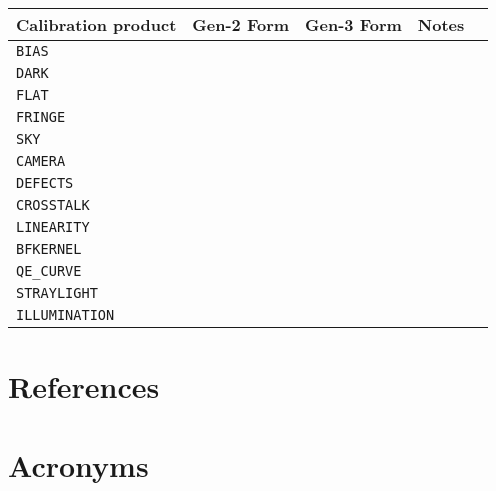 \documentclass[DM,authoryear,toc]{lsstdoc}
\begin{document}
\begin{tabular}{l |c|c|l|l}
  Calibration product & Gen-2 Form & Gen-3 Form & Notes \\
  \hline
  \verb|BIAS| & & & \\
  \verb|DARK| & & & \\
  \verb|FLAT| & & & \\
  \verb|FRINGE| & & & \\
  \verb|SKY| & & & \\
  \verb|CAMERA| & & & \\
  \verb|DEFECTS| & & & \\
  \verb|CROSSTALK| & & & \\
  \verb|LINEARITY| & & & \\
  \verb|BFKERNEL| & & & \\
  \verb|QE_CURVE| & & & \\
  \verb|STRAYLIGHT| & & & \\
  \verb|ILLUMINATION| & & & \\
\end{tabular}

\section{References} \label{sec:bib}


\section{Acronyms} \label{sec:acronyms}

\end{document}
